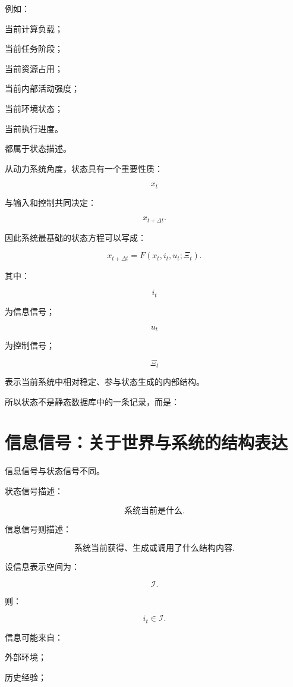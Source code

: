 例如：

当前计算负载；

当前任务阶段；

当前资源占用；

当前内部活动强度；

当前环境状态；

当前执行进度。

都属于状态描述。

从动力系统角度，状态具有一个重要性质：

\[
\boxed{
x_t
}
\]

与输入和控制共同决定：

\[
x_{t+\Delta t}.
\]

因此系统最基础的状态方程可以写成：

\[
\boxed{
x_{t+\Delta t}
=
F(
x_t,
i_t,
u_t;
\Xi_t
).
}
\]

其中：

\[
i_t
\]

为信息信号；

\[
u_t
\]

为控制信号；

\[
\Xi_t
\]

表示当前系统中相对稳定、参与状态生成的内部结构。

所以状态不是静态数据库中的一条记录，而是：

\begin{statementbox}
\centering
{}
\end{statementbox}

\section{信息信号：关于世界与系统的结构表达}

信息信号与状态信号不同。

状态信号描述：

\[
\text{系统当前是什么}.
\]

信息信号则描述：

\[
\text{系统当前获得、生成或调用了什么结构内容}.
\]

设信息表示空间为：

\[
\mathcal I.
\]

则：

\[
i_t\in\mathcal I.
\]

信息可能来自：

外部环境；

历史经验；

